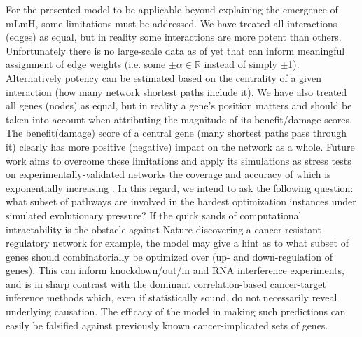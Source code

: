 For the presented model to be applicable beyond explaining the emergence of mLmH, some limitations must be addressed. 
We have treated all interactions (edges) as equal, but in reality some interactions are more potent than others. Unfortunately there is no large-scale data as of yet that can inform meaningful assignment of edge weights (i.e. some $\pm \alpha\in \mathbb{R}$ instead of simply $\pm$1). Alternatively potency can be estimated based on the centrality  of a given interaction (how many network shortest paths include it).  We have also treated all genes (nodes) as equal, but in reality a gene's position matters \cite{kim_positive_2007,gerstein_architecture_2012} and should be taken into account when attributing the magnitude of its benefit/damage scores. The benefit(damage) score of a central gene (many shortest paths pass through it) clearly has more positive (negative) impact on the network as a whole. Future work aims to overcome these limitations and apply its simulations as stress tests on experimentally-validated networks the coverage and accuracy of which is exponentially increasing \cite{han_trrust:_2015, neph_circuitry_2012, gerstein_architecture_2012, stergachis_conservation_2014}. In this regard, we intend to ask the following question: what subset of pathways are involved in the hardest optimization instances under simulated evolutionary pressure? If the quick sands of computational intractability is the obstacle against Nature discovering a cancer-resistant regulatory network for example, the model may give a hint as to what subset of genes should combinatorially be optimized over (up- and down-regulation of genes). This can inform knockdown/out/in and RNA interference experiments, and is in sharp contrast with the dominant correlation-based cancer-target inference methods which, even if statistically sound, do not necessarily reveal underlying causation. The efficacy of the model in making such predictions can easily be falsified against previously known cancer-implicated sets of genes. 
